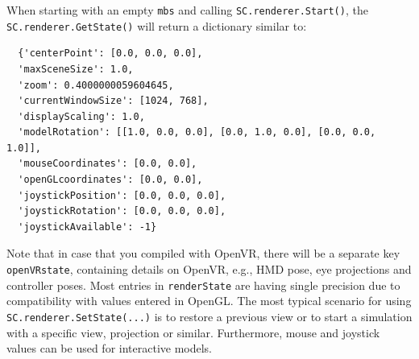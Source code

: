When starting with an empty \texttt{mbs} and calling \texttt{SC.renderer.Start()}, the \texttt{SC.renderer.GetState()} will return a dictionary similar to:
\pythonstyle\begin{lstlisting}
  {'centerPoint': [0.0, 0.0, 0.0],
  'maxSceneSize': 1.0,
  'zoom': 0.4000000059604645,
  'currentWindowSize': [1024, 768],
  'displayScaling': 1.0,
  'modelRotation': [[1.0, 0.0, 0.0], [0.0, 1.0, 0.0], [0.0, 0.0, 1.0]],
  'mouseCoordinates': [0.0, 0.0],
  'openGLcoordinates': [0.0, 0.0],
  'joystickPosition': [0.0, 0.0, 0.0],
  'joystickRotation': [0.0, 0.0, 0.0],
  'joystickAvailable': -1}
\end{lstlisting}
Note that in case that you compiled with OpenVR, there will be a separate key \texttt{openVRstate}, containing details on OpenVR, e.g., HMD pose, eye projections and controller poses.
Most entries in \texttt{renderState} are having single precision due to compatibility with values entered in OpenGL.
The most typical scenario for using \texttt{SC.renderer.SetState(...)} is to restore a previous view or to start a simulation with a specific view, projection or similar. Furthermore, mouse and joystick values can be used for interactive models.

